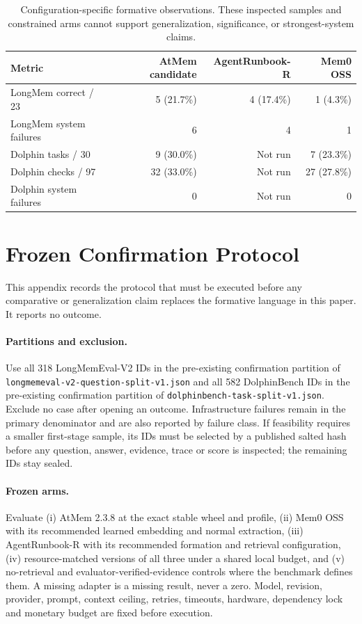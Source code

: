 \documentclass[10pt,twocolumn]{article}
\newcommand{\code}[1]{\texttt{\small #1}}
\begin{document}
\begin{table}[!t]
\centering\small
\begin{tabular}{lrrr}
\toprule
Metric & AtMem candidate & AgentRunbook-R & Mem0 OSS\\\midrule
LongMem correct / 23 & 5 (21.7\%) & 4 (17.4\%) & 1 (4.3\%)\\
LongMem system failures & 6 & 4 & 1\\
Dolphin tasks / 30 & 9 (30.0\%) & Not run & 7 (23.3\%)\\
Dolphin checks / 97 & 32 (33.0\%) & Not run & 27 (27.8\%)\\
Dolphin system failures & 0 & Not run & 0\\\bottomrule
\end{tabular}
\caption{Configuration-specific formative observations. These inspected samples and constrained arms cannot support generalization, significance, or strongest-system claims.}
\end{table}

\section{Frozen Confirmation Protocol}
\label{app:confirmation}
This appendix records the protocol that must be executed before any comparative or generalization claim replaces the formative language in this paper. It reports no outcome.

\paragraph{Partitions and exclusion.}
Use all 318 LongMemEval-V2 IDs in the pre-existing confirmation partition of \code{longmemeval-v2-question-split-v1.json} and all 582 DolphinBench IDs in the pre-existing confirmation partition of \code{dolphinbench-task-split-v1.json}. Exclude no case after opening an outcome. Infrastructure failures remain in the primary denominator and are also reported by failure class. If feasibility requires a smaller first-stage sample, its IDs must be selected by a published salted hash before any question, answer, evidence, trace or score is inspected; the remaining IDs stay sealed.

\paragraph{Frozen arms.}
Evaluate (i) AtMem 2.3.8 at the exact stable wheel and profile, (ii) Mem0 OSS with its recommended learned embedding and normal extraction, (iii) AgentRunbook-R with its recommended formation and retrieval configuration, (iv) resource-matched versions of all three under a shared local budget, and (v) no-retrieval and evaluator-verified-evidence controls where the benchmark defines them. A missing adapter is a missing result, never a zero. Model, revision, provider, prompt, context ceiling, retries, timeouts, hardware, dependency lock and monetary budget are fixed before execution.
\end{document}
